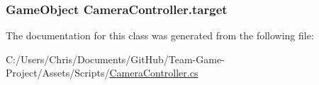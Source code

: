\subsubsection[{\texorpdfstring{target}{target}}]{\setlength{\rightskip}{0pt plus 5cm}Game\+Object Camera\+Controller.\+target}\hypertarget{class_camera_controller_a2a671c90de07af1a4f8b7530268e9f3a}{}\label{class_camera_controller_a2a671c90de07af1a4f8b7530268e9f3a}


The documentation for this class was generated from the following file\+:\begin{DoxyCompactItemize}
\item 
C\+:/\+Users/\+Chris/\+Documents/\+Git\+Hub/\+Team-\/\+Game-\/\+Project/\+Assets/\+Scripts/\hyperlink{_camera_controller_8cs}{Camera\+Controller.\+cs}\end{DoxyCompactItemize}
